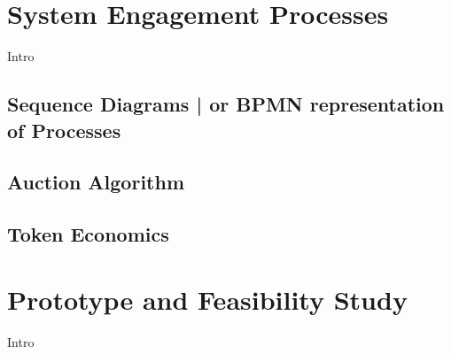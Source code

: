 \documentclass{llncs}
\begin{document}
{	%
	
	\section{System Engagement Processes}
		\label{section-5}	
	
		Intro
		


		\subsection{Sequence Diagrams | or BPMN representation of Processes}

		
		\subsection{Auction Algorithm}
			\label{ss:auchtion-algorithm}				


		\subsection{Token Economics}
		


	\section{Prototype and Feasibility Study}
		\label{section-6}	
			
		Intro
		
		
}
\end{document}
